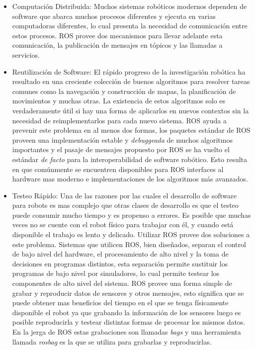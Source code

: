 \documentclass[withindex,glossary]{cam-thesis}
\begin{document}
\begin{itemize}
  \item Computación Distribuida: Muchos sistemas robóticos modernos dependen de software que abarca muchos procesos diferentes y ejecuta  en varias computadoras diferentes, lo cual presenta la necesidad de comunicación entre estos procesos. ROS provee dos mecanismos para llevar adelante esta comunicación, la publicación de mensajes en tópicos y las llamadas a servicios.
  \item Reutilización de Software: El rápido progreso de la investigación robótica ha resultado en una creciente colección de buenos algoritmos para resolver tareas comunes como la navegación y construcción de mapas, la planificación de movimientos y muchas otras. La existencia de estos algoritmos solo es verdaderamente útil si hay una forma de aplicarlos en nuevos contextos sin la necesidad de reimplementarlos para cada nuevo sistema. ROS ayuda a prevenir este problema en al menos dos formas, los paquetes estándar de ROS proveen una implementación estable y \textit{debuggeada} de muchos algoritmos importantes y el pasaje de mensajes propuesto por ROS se ha vuelto el estándar \textit{de facto} para la interoperabilidad de software robótico. Esto resulta en que comúnmente se encuentren disponibles para ROS interfaces al hardware mas moderno e implementaciones de los algoritmos más avanzados.
  \item Testeo Rápido: Una de las razones por las cuales el desarrollo de software para robots es mas complejo que otras clases de desarrollo es que el testeo puede consumir mucho tiempo y es propenso a errores. Es posible que muchas veces no se cuente con el robot físico para trabajar con él, y cuando está disponible el trabajo es lento y delicado. Utilizar ROS provee dos soluciones a este problema. Sistemas que utilicen ROS, bien diseñados, separan el control de bajo nivel del hardware, el procesamiento de alto nivel y la toma de decisiones en programas distintos, esta separación permite sustituir los programas de bajo nivel por simuladores, lo cual permite testear los componentes de alto nivel del sistema. ROS provee una forma simple de grabar y reproducir datos de sensores y otros mensajes, esto significa que se puede obtener mas beneficios del tiempo en el que se tenga físicamente disponible el robot ya que grabando la información de los sensores luego es posible reproducirla y testear distintas formas de procesar los mismos datos. En la jerga de ROS estas grabaciones son llamadas \textit{bags} y una herramienta llamada \textit{rosbag} es la que se utiliza para grabarlas y reproducirlas.
\end{itemize}
\end{document}
